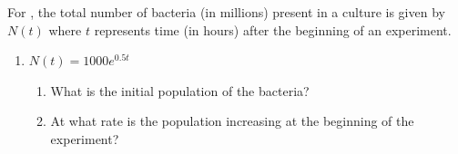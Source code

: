 \documentclass{book}
\begin{document}
For , the total number of bacteria (in millions) present in a culture is given by $N(t)$  where $t$ represents time (in hours) after the beginning of an experiment. 
\begin{enumerate}[!HW!]
\item\label{exer:popgrowth:stop} $N(t) = 1000e^{0.5t}$
\begin{enumerate}
\item What is the initial population of the bacteria?
\item At what rate is the population increasing at the beginning of the experiment?\\
\end{enumerate}
\end{enumerate}
\end{document}
